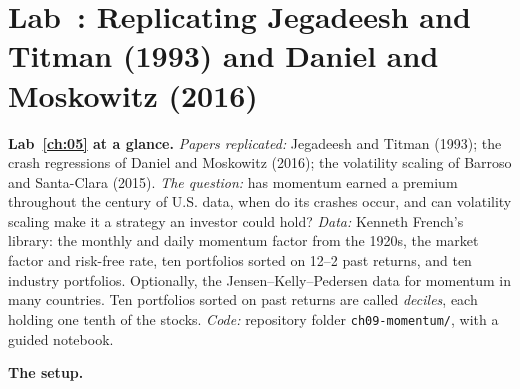\section{Lab~\thechapter: Replicating Jegadeesh and Titman (1993) and Daniel and Moskowitz (2016)}
\label{sec:05-lab}

\begin{callout}
\textbf{Lab~\ref{ch:05} at a glance.} \emph{Papers replicated:} Jegadeesh and Titman (1993); the crash regressions of Daniel and Moskowitz (2016); the volatility scaling of Barroso and Santa-Clara (2015). \emph{The question:} has momentum earned a premium throughout the century of U.S. data, when do its crashes occur, and can volatility scaling make it a strategy an investor could hold? \emph{Data:} Kenneth French's library: the monthly and daily momentum factor from the 1920s, the market factor and risk-free rate, ten portfolios sorted on 12--2 past returns, and ten industry portfolios. Optionally, the Jensen--Kelly--Pedersen data for momentum in many countries. Ten portfolios sorted on past returns are called \emph{deciles}, each holding one tenth of the stocks. \emph{Code:} repository folder \texttt{ch09-momentum/}, with a guided notebook.
\end{callout}

\textbf{The setup.}

